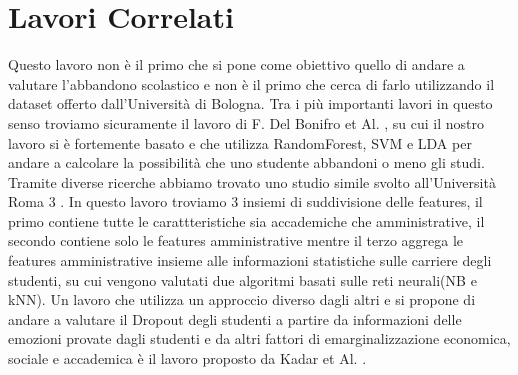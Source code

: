 \documentclass[../Report.tex]{subfiles}
\begin{document}
        \section{Lavori Correlati} 
        Questo lavoro non è il primo che si pone come obiettivo quello di andare a valutare l'abbandono scolastico e non è il primo che cerca di farlo utilizzando il dataset offerto dall'Università di Bologna. Tra i più importanti lavori in questo senso troviamo sicuramente il lavoro di F. Del Bonifro et Al. \cite{DelBonifro}, su cui il nostro lavoro si è fortemente basato e che utilizza RandomForest, SVM e LDA per andare a calcolare la possibilità che uno studente abbandoni o meno gli studi. 
        Tramite diverse ricerche abbiamo trovato uno studio simile svolto all'Università Roma 3 \cite{agrusti2020deep}. In questo lavoro troviamo 3 insiemi di suddivisione delle features, il primo contiene tutte le carattteristiche sia accademiche che amministrative, il secondo contiene solo le features amministrative mentre il terzo aggrega le features amministrative insieme alle informazioni statistiche sulle carriere degli studenti, su cui vengono valutati due algoritmi basati sulle reti neurali(NB e kNN). Un lavoro che utilizza un approccio diverso dagli altri e si propone di andare a valutare il Dropout degli studenti a partire da informazioni delle emozioni provate dagli studenti e da altri fattori di emarginalizzazione economica, sociale e accademica è il lavoro proposto da Kadar et Al. \cite{Kadar}. 
        
\end{document}
